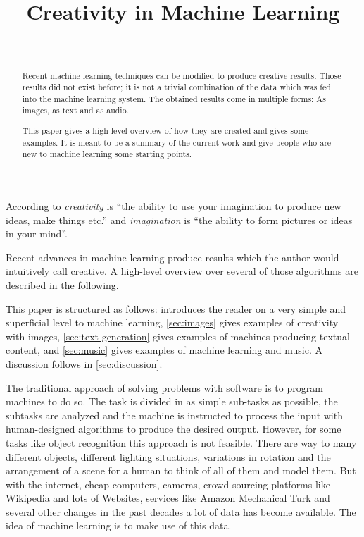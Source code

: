 \documentclass[technote,a4paper,leqno]{IEEEtran}
\title{Creativity in Machine Learning}
\author{%
    \IEEEauthorblockN{Martin Thoma}\\
    \IEEEauthorblockA{E-Mail: info@martin-thoma.de} %
}
\begin{document}
\maketitle
\begin{abstract}
Recent machine learning techniques can be modified to produce creative
results. Those results did not exist before; it is not a trivial
combination of the data which was fed into the machine learning system. The
obtained results come in multiple forms: As images, as text and as audio.

This paper gives a high level overview of how they are created and gives some
examples. It is meant to be a summary of the current work and give people
who are new to machine learning some starting points.
\end{abstract}

According to \cite{LongmanDCE06}\textit{creativity} is \enquote{the ability to
use your imagination to produce new ideas, make things etc.} and
\textit{imagination} is \enquote{the ability to form pictures or ideas in your
mind}.

Recent advances in machine learning produce results which the author would
intuitively call creative. A high-level overview over several of those
algorithms are described in the following.

This paper is structured as follows:  introduces the
reader on a very simple and superficial level to machine learning,
\cref{sec:images} gives examples of creativity with images,
\cref{sec:text-generation} gives examples of machines producing textual
content, and \cref{sec:music} gives examples of machine learning and music. A
discussion follows in
\cref{sec:discussion}.

The traditional approach of solving problems with software is to program
machines to do so. The task is divided in as simple sub-tasks as possible,
the subtasks are analyzed and the machine is instructed to process the input
with human-designed algorithms to produce the desired output. However, for
some tasks like object recognition this approach is not feasible. There are
way to many different objects, different lighting situations, variations in
rotation and the arrangement of a scene for a human to think of all of them and
model them. But with the internet, cheap computers, cameras, crowd-sourcing
platforms like Wikipedia and lots of Websites, services like Amazon Mechanical
Turk and several other changes in the past decades a lot of data has become
available. The idea of machine learning is to make use of this data.
\end{document}
